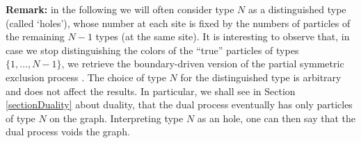 \documentclass[10pt]{article}
\numberwithin{equation}{section}
\numberwithin{equation}{subsection}
\begin{document}
\vspace{.5cm}
\noindent
{\bf Remark:} in the following we will often consider type $N$ as a distinguished type
(called `holes'), whose number at each site is fixed by the numbers of particles 
of the remaining $N-1$ types (at the same site). It is interesting to observe that, in case we stop distinguishing the colors of the ``true'' particles of types $\{1,\ldots,N-1\}$, we retrieve the 
boundary-driven version of the partial symmetric exclusion process \cite{schutzSandow,carinci2013duality}.
The choice of type $N$ for the distinguished type is arbitrary and does not affect
the results. In particular, we shall see in Section \ref{sectionDuality} about duality, that
the dual process eventually has only particles of type $N$ on the graph.
Interpreting type $N$ as an hole, one can then say that the dual process voids the graph.  
\end{document}
